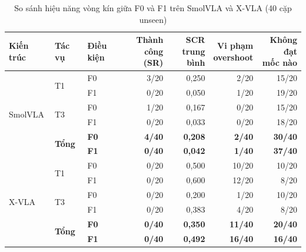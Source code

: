 \begin{table}[htbp]
\centering\small
\caption{So sánh hiệu năng vòng kín giữa F0 và F1 trên SmolVLA và X-VLA (40 cặp unseen)}
\label{tab:e2-comparison}
\label{tab:e2-unseen-results}
\label{tab:xvla-e2-results}
\setlength{\tabcolsep}{4.5pt}
\begin{tabular}{|l|l|l|r|r|r|r|}
\hline
\textbf{Kiến trúc} & \textbf{Tác vụ} & \textbf{Điều kiện} & \shortstack{\textbf{Thành công}\\\textbf{(SR)}} & \shortstack{\textbf{SCR}\\\textbf{trung bình}} & \shortstack{\textbf{Vi phạm}\\\textbf{overshoot}} & \shortstack{\textbf{Không đạt}\\\textbf{mốc nào}} \\ \hline
\multirow{6}{*}{SmolVLA} & \multirow{2}{*}{T1} & F0 & 3/20 & 0,250 & 2/20 & 15/20 \\ \cline{3-7}
        &    & F1 & 0/20 & 0,050 & 1/20 & 19/20 \\ \cline{2-7}
        & \multirow{2}{*}{T3} & F0 & 1/20 & 0,167 & 0/20 & 15/20 \\ \cline{3-7}
        &    & F1 & 0/20 & 0,033 & 0/20 & 18/20 \\ \cline{2-7}
        & \multirow{2}{*}{\textbf{Tổng}} & \textbf{F0} & \textbf{4/40} & \textbf{0,208} & \textbf{2/40} & \textbf{30/40} \\ \cline{3-7}
        &               & \textbf{F1} & \textbf{0/40} & \textbf{0,042} & \textbf{1/40} & \textbf{37/40} \\ \hline
\multirow{6}{*}{X-VLA}   & \multirow{2}{*}{T1} & F0 & 0/20 & 0,500 & 10/20 & 10/20 \\ \cline{3-7}
        &    & F1 & 0/20 & 0,600 & 12/20 & 8/20 \\ \cline{2-7}
        & \multirow{2}{*}{T3} & F0 & 0/20 & 0,200 & 1/20 & 10/20 \\ \cline{3-7}
        &    & F1 & 0/20 & 0,383 & 4/20 & 8/20 \\ \cline{2-7}
        & \multirow{2}{*}{\textbf{Tổng}} & \textbf{F0} & \textbf{0/40} & \textbf{0,350} & \textbf{11/40} & \textbf{20/40} \\ \cline{3-7}
        &               & \textbf{F1} & \textbf{0/40} & \textbf{0,492} & \textbf{16/40} & \textbf{16/40} \\ \hline
\end{tabular}
\end{table}

